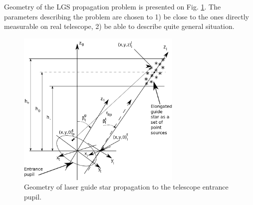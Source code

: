 Geometry of the LGS propagation problem is presented on Fig.
\ref{fig:lgs-geom}. The parameters describing the problem are chosen to 1) be
close to the ones directly measurable on real telescope, 2) be able to
describe quite general situation.

\begin{figure}[htp]
\begin{center}
 \includegraphics[width = 0.7\textwidth]{LGS.png}
\end{center}
\caption{Geometry of laser guide star propagation to the telescope entrance
pupil.}
\label{fig:lgs-geom}
\end{figure}

